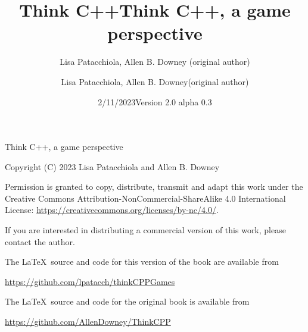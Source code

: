 \documentclass{book}
\title{Think C++}
\author{Lisa Patacchiola, Allen B. Downey (original author)}
\date{2/11/2023}
\begin{document}
\title {Think C++, a game perspective}
\author {Lisa Patacchiola, Allen B. Downey(original author)}
\date {Version 2.0 alpha 0.3}
\maketitle

\vspace{2in}
\begin{center}
{\Large Think C++, a game perspective}

\vspace{0.25in}

Copyright (C) 2023 Lisa Patacchiola and Allen B. Downey
\end{center}
\vspace{0.25in}

Permission is granted to copy, distribute, transmit and adapt this
work under the Creative Commons Attribution-NonCommercial-ShareAlike 4.0
International License: \url{https://creativecommons.org/licenses/by-nc/4.0/}.

If you are interested in distributing a commercial version of this
work, please contact the author.

\bigskip
The \LaTeX\ source and code for this version of the book are available from

\bigskip
\url{https://github.com/lpatacch/thinkCPPGames}

\bigskip
The \LaTeX\ source and code for the original book is available from

\bigskip
\url{https://github.com/AllenDowney/ThinkCPP}



\frontmatter

\tableofcontents

\mainmatter
















\appendix


\printindex
\end{document}
